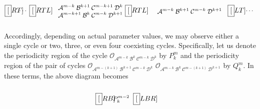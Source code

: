 \documentclass[12pt]{article}
\newcommand{\A}{{\mathcal A}}
\newcommand{\B}{{\mathcal B}}
\newcommand{\C}{{\mathcal C}}
\newcommand{\D}{{\mathcal D}}
\newcommand{\LC}{{\mathcal O}}
\begin{document}
\begin{enumerate}
\begin{equation}
\begin{split}
{            }\\[-1.5em]
            &
            \fbox[RT]{
              \begin{minipage}[c][4.5em][c]{3ex}\small
                \hspace*{-.7em}\dots
              \end{minipage}
            }\hspace*{-1ex}
            \fbox[RTL]{
              \begin{minipage}[c][3.5em][c]{11em}\small\centering
                $\A^{m-k}\:\B^{k+1}\:\C^{m-k+1}    \:\D^{k}$\\
                $\A^{m-k+1}   \:\B^{k}  \:\C^{m-k}\:\D^{k+1}$
              \end{minipage}
            }\hspace*{-1ex}
            \fbox[RTL]{
              \begin{minipage}[c][4.5em][c]{12em}\small\centering
                $\A^{m-k}\:\B^{k+1}\:\C^{m-k}\:\D^{k+1}$
              \end{minipage}
            }
            \hspace*{-1ex}
            \fbox[LT]{
              \begin{minipage}[c][3.5em][c]{1ex}\small
                \dots
              \end{minipage}
            }
          \end{split}
        \end{equation}
        Accordingly, depending on actual parameter values, we may observe
        either a single cycle or two, three, or even four coexisting cycles.
        Specifically, let us denote the periodicity region of the cycle
        $\LC_{\A^{m-k}\:\B^k\:\C^{m-k}\:\D^k}$ by $P^m_k$ and the
        periodicity region of the pair of cycles
        $\LC_{\A^{m-(k+1)}\:\B^{k+1}\:\C^{m-k} \:\D^{k}}$ $\LC_{\A^{m-k}
            \:\B^{k} \:\C^{m-(k+1)}\:\D^{k+1}}$ by $Q^m_k$. In these terms,
        the above diagram becomes
        \begin{equation}
          \begin{split}
            &
            \fbox[RB]{
              \begin{minipage}[c][4em][c]{3em}\small
                \hspace*{-.7em}
                $P^{m-2}_k$
              \end{minipage}
            }\hspace*{-1ex}
            \fbox[LBR]{
              \begin{minipage}[c][3em][c]{3em}\small\centering

\end{minipage}}
\end{split}
\end{equation}
\end{enumerate}
\end{document}
